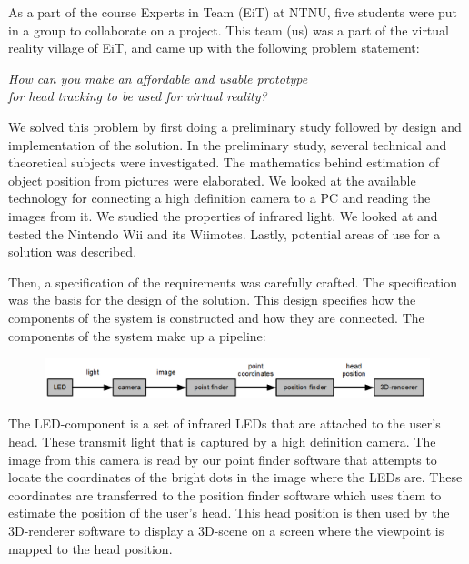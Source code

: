 As a part of the course Experts in Team (EiT) at NTNU, five students were put in a group to collaborate on a project. This team (us) was a part of the virtual reality village of EiT, and came up with the following problem statement:

\setlength{\parskip}{-0.15in}
\begin{center}
	\em How can you make an affordable and usable prototype\\
	for head tracking to be used for virtual reality?
\end{center}

We solved this problem by first doing a preliminary study followed by design and implementation of the solution. In the preliminary study, several technical and theoretical subjects were investigated. The mathematics behind estimation of object position from pictures were elaborated. We looked at the available technology for connecting a high definition camera to a PC and reading the images from it. We studied the properties of infrared light. We looked at and tested the Nintendo Wii and its Wiimotes. Lastly, potential areas of use for a solution was described.

\setlength{\parskip}{0.1in}

Then, a specification of the requirements was carefully crafted. The specification was the basis for the design of the solution. This design specifies how the components of the system is constructed and how they are connected. The components of the system make up a pipeline:

\begin{figure}[h]
\centering
\includegraphics[width=\textwidth]{graphics/main_design_english.png}
\end{figure}

The LED-component is a set of infrared LEDs that are attached to the user's head. These transmit light that is captured by a high definition camera. The image from this camera is read by our point finder software that attempts to locate the coordinates of the bright dots in the image where the LEDs are. These coordinates are transferred to the position finder software which uses them to estimate the position of the user's head. This head position is then used by the 3D-renderer software to display a 3D-scene on a screen where the viewpoint is mapped to the head position.

